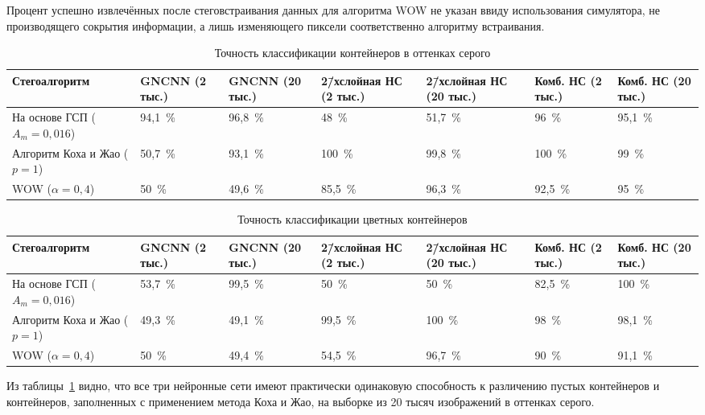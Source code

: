 Процент успешно извлечённых после стеговстраивания данных для алгоритма WOW не указан ввиду использования симулятора, не производящего сокрытия информации, а лишь изменяющего пиксели соответственно алгоритму встраивания.
\begin{landscape}

\begin{table}[p]
\centering
    \begin{tabular}{| l | p{2cm} | p{2cm} | p{2cm} | p{2cm} | p{2cm} | p{2cm} |}
    \hline
    Стегоалгоритм & GNCNN (2 тыс.) & GNCNN (20 тыс.) & 2\=/хслойная НС (2 тыс.) & 2\=/хслойная НС (20 тыс.) & Комб. НС (2 тыс.) & Комб. НС (20 тыс.) \\ \hline
    На основе ГСП ($ A_m = 0,016 $) & 94,1~\% & 96,8~\% & 48~\% & 51,7~\% & 96~\% & 95,1~\% \\ \hline
    Алгоритм Коха и Жао ($ p = 1 $) & 50,7~\% & 93,1~\% & 100~\% & 99,8~\% & 100~\% & 99~\% \\ \hline
    WOW ($ \alpha = 0,4 $) & 50~\% & 49,6~\% & 85,5~\% & 96,3~\% & 92,5~\% & 95~\% \\ \hline
    \end{tabular}
\caption{Точность классификации контейнеров в оттенках серого}
\label{table:2}
\end{table}

\begin{table}[p]
\centering
    \begin{tabular}{| l | p{2cm} | p{2cm} | p{2cm} | p{2cm} | p{2cm} | p{2cm} |}
    \hline
    Стегоалгоритм & GNCNN (2 тыс.) & GNCNN (20 тыс.) & 2\=/хслойная НС (2 тыс.) & 2\=/хслойная НС (20 тыс.) & Комб. НС (2 тыс.) & Комб. НС (20 тыс.) \\ \hline
    На основе ГСП ($ A_m = 0,016 $) & 53,7~\% & 99,5~\% & 50~\% & 50~\% & 82,5~\% & 100~\% \\ \hline
    Алгоритм Коха и Жао ($ p = 1 $) & 49,3~\% & 49,1~\% & 99,5~\% & 100~\% & 98~\% & 98,1~\% \\ \hline
    WOW ($ \alpha = 0,4 $) & 50~\% & 49,4~\% & 54,5~\% & 96,7~\% & 90~\% & 91,1~\% \\ \hline
    \end{tabular}
\caption{Точность классификации цветных контейнеров}
\label{table:2Color}
\end{table}
\end{landscape}

Из таблицы~\ref{table:2} видно, что все три нейронные сети имеют практически одинаковую способность к различению пустых контейнеров и контейнеров, заполненных с применением метода Коха и Жао, на выборке из 20 тысяч изображений в оттенках серого.

